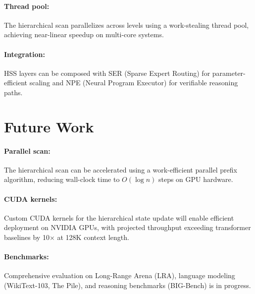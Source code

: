 \documentclass[10pt,twocolumn]{IEEEtran}
\begin{document}
\paragraph{Thread pool:} The hierarchical scan parallelizes
across levels using a work-stealing thread pool, achieving
near-linear speedup on multi-core systems.

\paragraph{Integration:} HSS layers can be composed with SER
(Sparse Expert Routing) for parameter-efficient scaling and
NPE (Neural Program Executor) for verifiable reasoning paths.

\section{Future Work}

\paragraph{Parallel scan:} The hierarchical scan can be
accelerated using a work-efficient parallel prefix algorithm,
reducing wall-clock time to $O(\log n)$ steps on GPU hardware.

\paragraph{CUDA kernels:} Custom CUDA kernels for the
hierarchical state update will enable efficient deployment
on NVIDIA GPUs, with projected throughput exceeding transformer
baselines by 10$\times$ at 128K context length.

\paragraph{Benchmarks:} Comprehensive evaluation on
Long-Range Arena (LRA), language modeling (WikiText-103,
The Pile), and reasoning benchmarks (BIG-Bench) is in progress.



\end{document}
